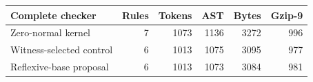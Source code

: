 \begin{center}
\small
\begin{tabular}{lrrrrr}
\toprule
Complete checker & Rules & Tokens & AST & Bytes & Gzip-9\\
\midrule
Zero-normal kernel & 7 & 1073 & 1136 & 3272 & 996\\
Witness-selected control & 6 & 1013 & 1075 & 3095 & 977\\
Reflexive-base proposal & 6 & 1013 & 1073 & 3084 & 981\\
\bottomrule
\end{tabular}
\end{center}
